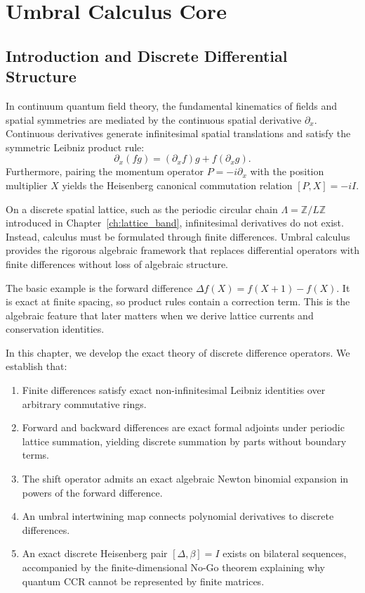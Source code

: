 \chapter{Umbral Calculus Core}
\label{ch:umbral_calculus}

\section{Introduction and Discrete Differential Structure}

In continuum quantum field theory, the fundamental kinematics of fields and spatial symmetries are mediated by the continuous spatial derivative $\partial_x$. Continuous derivatives generate infinitesimal spatial translations and satisfy the symmetric Leibniz product rule:
\begin{equation}
\partial_x(f g) = (\partial_x f) g + f (\partial_x g).
\end{equation}
Furthermore, pairing the momentum operator $P = -i \partial_x$ with the position multiplier $X$ yields the Heisenberg canonical commutation relation $[P, X] = -i I$.

On a discrete spatial lattice, such as the periodic circular chain $\Lambda = \mathbb{Z}/L\mathbb{Z}$ introduced in Chapter~\ref{ch:lattice_band}, infinitesimal derivatives do not exist. Instead, calculus must be formulated through finite differences. Umbral calculus provides the rigorous algebraic framework that replaces differential operators with finite differences without loss of algebraic structure. 

The basic example is the forward difference $\Delta f(X)=f(X+1)-f(X)$. It is exact at finite spacing, so product rules contain a correction term. This is the algebraic feature that later matters when we derive lattice currents and conservation identities.

In this chapter, we develop the exact theory of discrete difference operators. We establish that:
\begin{enumerate}
    \item Finite differences satisfy exact non-infinitesimal Leibniz identities over arbitrary commutative rings.
    \item Forward and backward differences are exact formal adjoints under periodic lattice summation, yielding discrete summation by parts without boundary terms.
    \item The shift operator admits an exact algebraic Newton binomial expansion in powers of the forward difference.
    \item An umbral intertwining map connects polynomial derivatives to discrete differences.
    \item An exact discrete Heisenberg pair $[\Delta, \beta] = I$ exists on bilateral sequences, accompanied by the finite-dimensional No-Go theorem explaining why quantum CCR cannot be represented by finite matrices.
\end{enumerate}

